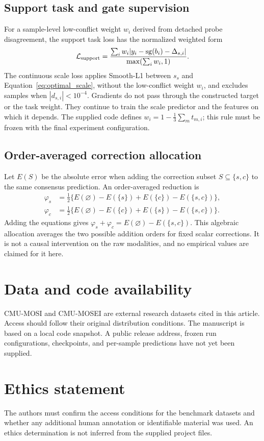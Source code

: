 \documentclass[review,12pt]{elsarticle}
\newcommand{\sg}{\operatorname{sg}}
\begin{document}
\subsection{Support task and gate supervision}
For a sample-level low-conflict weight $w_i$ derived from detached probe disagreement, the support task loss has the normalized weighted form
\begin{equation}
\mathcal L_{\rm support}=\frac{\sum_i w_i|y_i-\sg(b_i)-\Delta_{s,i}|}{\max(\sum_i w_i,1)}.
\end{equation}
The continuous scale loss applies Smooth-L1 between $s_s$ and Equation~\eqref{eq:optimal_scale}, without the low-conflict weight $w_i$, and excludes samples when $|d_{s,i}|<10^{-4}$. Gradients do not pass through the constructed target or the task weight. They continue to train the scale predictor and the features on which it depends. The supplied code defines $w_i=1-\frac13\sum_m t_{m,i}$; this rule must be frozen with the final experiment configuration.

\subsection{Order-averaged correction allocation}
Let $E(S)$ be the absolute error when adding the correction subset $S\subseteq\{s,c\}$ to the same consensus prediction. An order-averaged reduction is
\begin{align}
\varphi_s&=\tfrac12\{E(\varnothing)-E(\{s\})+E(\{c\})-E(\{s,c\})\},\\
\varphi_c&=\tfrac12\{E(\varnothing)-E(\{c\})+E(\{s\})-E(\{s,c\})\}.
\end{align}
Adding the equations gives $\varphi_s+\varphi_c=E(\varnothing)-E(\{s,c\})$. This algebraic allocation averages the two possible addition orders for fixed scalar corrections. It is not a causal intervention on the raw modalities, and no empirical values are claimed for it here.

\section*{Data and code availability}
CMU-MOSI and CMU-MOSEI are external research datasets cited in this article. Access should follow their original distribution conditions. The manuscript is based on a local code snapshot. A public release address, frozen run configurations, checkpoints, and per-sample predictions have not yet been supplied.

\section*{Ethics statement}
The authors must confirm the access conditions for the benchmark datasets and whether any additional human annotation or identifiable material was used. An ethics determination is not inferred from the supplied project files.
\end{document}
